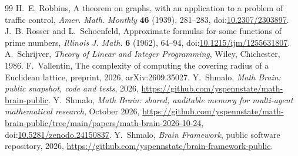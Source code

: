 \documentclass[11pt]{amsart}
\theoremstyle{definition}
\theoremstyle{remark}
\numberwithin{equation}{section}
\newcommand{\doi}[1]{doi:\href{https://doi.org/#1}{#1}}
\begin{document}
\begin{thebibliography}{99}
 H.~E. Robbins, A theorem on graphs, with an application to a problem of traffic control, \emph{Amer. Math. Monthly} \textbf{46} (1939), 281--283, \doi{10.2307/2303897}.
 J.~B. Rosser and L.~Schoenfeld, Approximate formulas for some functions of prime numbers, \emph{Illinois J. Math.} \textbf{6} (1962), 64--94, \doi{10.1215/ijm/1255631807}.
 A.~Schrijver, \emph{Theory of Linear and Integer Programming}, Wiley, Chichester, 1986.
 F.~Vallentin, The complexity of computing the covering radius of a Euclidean lattice, preprint, 2026, arXiv:2609.35027.
 Y.~Shmalo, \emph{Math Brain: public snapshot, code and tests}, 2026, \url{https://github.com/yspennstate/math-brain-public}.
 Y.~Shmalo, \emph{Math Brain: shared, auditable memory for multi-agent mathematical research}, October 2026, \url{https://github.com/yspennstate/math-brain-public/tree/main/papers/math-brain-2026-10-24}, \doi{10.5281/zenodo.24150837}.
 Y.~Shmalo, \emph{Brain Framework}, public software repository, 2026, \url{https://github.com/yspennstate/brain-framework-public}.
\end{thebibliography}
\end{document}
